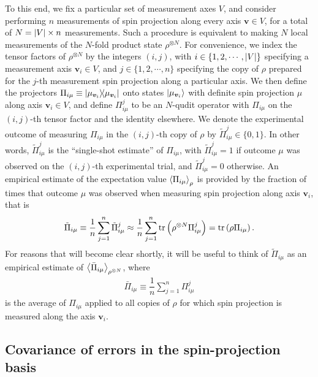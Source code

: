 \documentclass[notitlepage,twocolumn]{revtex4-2}
\newcommand{\f}[2]{\dfrac{#1}{#2}} %
\newcommand{\p}[1]{\left(#1\right)} %
\newcommand{\bk}{\Braket} %
\renewcommand{\v}{\bm} %
\renewcommand{\set}[1]{\{#1\}} %
\begin{document}
To this end, we fix a particular set of measurement axes $V$, and consider performing $n$ measurements of spin projection along every axis $\v v\in V$, for a total of $N=\abs{V}\times n$ measurements.
Such a procedure is equivalent to making $N$ local measurements of the $N$-fold product state $\rho^{\otimes N}$.
For convenience, we index the tensor factors of $\rho^{\otimes N}$ by the integers $\p{i,j}$, with $i\in\set{1,2,\cdots,\abs{V}}$ specifying a measurement axis $\v v_i\in V$, and $j\in\set{1,2,\cdots,n}$ specifying the copy of $\rho$ prepared for the $j$-th measurement spin projection along a particular axis.
We then define the projectors $\Pi_{i\mu}\equiv\op{\mu_{\v v_i}}$ onto states $\ket{\mu_{\v v_i}}$ with definite spin projection $\mu$ along axis $\v v_i\in V$, and define $\Pi_{i\mu}^j$ to be an $N$-qudit operator with $\Pi_{i\mu}$ on the $\p{i,j}$-th tensor factor and the identity elsewhere.
We denote the experimental outcome of measuring $\Pi_{i\mu}$ in the $\p{i,j}$-th copy of $\rho$ by $\tilde \Pi_{i\mu}^j\in\set{0,1}$.
In other words, $\tilde \Pi_{i\mu}^j$ is the ``single-shot estimate'' of $\Pi_{i\mu}$, with $\tilde \Pi_{i\mu}^j=1$ if outcome $\mu$ was observed on the $\p{i,j}$-th experimental trial, and $\tilde \Pi_{i\mu}^j=0$ otherwise.
An empirical estimate of the expectation value $\bk{\Pi_{i\mu}}_\rho$ is provided by the fraction of times that outcome $\mu$ was observed when measuring spin projection along axis $\v v_i$, that is
\begin{align}
  \tilde \Pi_{i\mu} \equiv \f1n \sum_{j=1}^n \tilde \Pi_{i\mu}^j
  \approx \f1n \sum_{j=1}^n \tr\p{\rho^{\otimes N} \Pi_{i\mu}^j}
  = \tr\p{\rho \Pi_{i\mu}}.
\end{align}
For reasons that will become clear shortly, it will be useful to think of $\tilde \Pi_{i\mu}$ as an empirical estimate of $\bk{\bar \Pi_{i\mu}}_{\rho^{\otimes N}}$, where
\begin{align}
  \bar \Pi_{i\mu} \equiv \f1n \sum_{j=1}^n \Pi_{i\mu}^j
  \label{eq:mean_proj}
\end{align}
is the average of $\Pi_{i\mu}$ applied to all copies of $\rho$ for which spin projection is measured along the axis $\v v_i$.

\subsection{Covariance of errors in the spin-projection basis}
\end{document}

